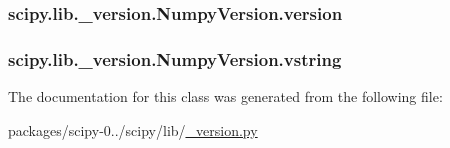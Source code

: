 \subsubsection[{version}]{\setlength{\rightskip}{0pt plus 5cm}scipy.\+lib.\+\_\+version.\+Numpy\+Version.\+version}\label{classscipy_1_1lib_1_1__version_1_1NumpyVersion_a8630787243493374a9995f1b0193a42d}
\hypertarget{classscipy_1_1lib_1_1__version_1_1NumpyVersion_a03d9c58eea51a0c21d0c49058388047a}{}
\subsubsection[{vstring}]{\setlength{\rightskip}{0pt plus 5cm}scipy.\+lib.\+\_\+version.\+Numpy\+Version.\+vstring}\label{classscipy_1_1lib_1_1__version_1_1NumpyVersion_a03d9c58eea51a0c21d0c49058388047a}


The documentation for this class was generated from the following file\+:\begin{DoxyCompactItemize}
\item 
packages/scipy-\/0../scipy/lib/\hyperlink{__version_8py}{\+\_\+version.\+py}\end{DoxyCompactItemize}
